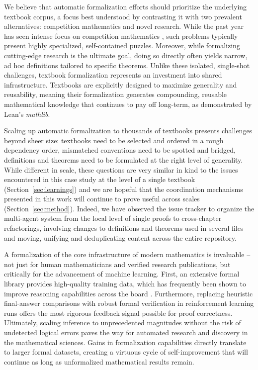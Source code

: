 \documentclass[]{fairmeta}
\begin{document}
We believe that automatic formalization efforts should prioritize the underlying textbook corpus, a focus best understood by contrasting it with two prevalent alternatives: competition mathematics and novel research. While the past year has seen intense focus on competition mathematics \citep{chen2025seedproverdeepbroadreasoning,hubert2025olympiad,achim2025aristotleimolevelautomatedtheorem}, such problems typically present highly specialized, self-contained puzzles. Moreover, while formalizing cutting-edge research is the ultimate goal, doing so directly often yields narrow, ad hoc definitions tailored to specific theorems. 
Unlike these isolated, single-shot challenges, textbook formalization represents an investment into shared infrastructure.
Textbooks are explicitly designed to maximize generality and reusability, meaning their formalization generates compounding, reusable mathematical knowledge that continues to pay off long-term, as demonstrated by Lean's \emph{mathlib}.


Scaling up automatic formalization to thousands of textbooks presents challenges beyond sheer size:
textbooks need to be selected and ordered in a rough dependency order, mismatched conventions need to be spotted and bridged, definitions and theorems need to be formulated at the right level of generality.
While different in scale, these questions are very similar in kind to the issues encountered in this case study at the level of a single textbook (Section~\ref{sec:learnings}) and we are hopeful that the coordination mechanisms presented in this work will continue to prove useful across scales (Section~\ref{sec:method}). Indeed, we have observed the issue tracker to organize the multi-agent system from the local level of single proofs to cross-chapter refactorings, involving changes to definitions and theorems used in several files and moving, unifying and deduplicating content across the entire repository.







A formalization of the core infrastructure of modern mathematics is invaluable -- not just for human mathematicians and verified research publications, but critically for the advancement of machine learning. First, an extensive formal library provides high-quality training data, which has frequently been shown to improve reasoning capabilities across the board \citep{zhang2024unveilingimpactcodingdata,ma2023trainingstagedoescode,yang2025codethinkthinkcode}. Furthermore, replacing heuristic final-answer comparisons with robust formal verification in reinforcement learning runs offers the most rigorous feedback signal possible for proof correctness. Ultimately, scaling inference to unprecedented magnitudes without the risk of undetected logical errors paves the way for automated research and discovery in the mathematical sciences. Gains in formalization capabilities directly translate to larger formal datasets, creating a virtuous cycle of self-improvement that will continue as long as unformalized mathematical results remain.
\end{document}
